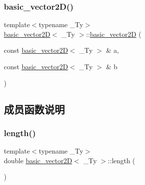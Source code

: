 \mbox{\label{structbasic__vector2_d_a348d37f966eeda40626112688649cb70}} 
\subsubsection{\texorpdfstring{basic\+\_\+vector2\+D()}{basic\_vector2D()}\hspace{0.1cm}{\footnotesize\ttfamily [2/2]}}
{\footnotesize\ttfamily template$<$typename \+\_\+\+Ty$>$ \\
\hyperlink{structbasic__vector2_d}{basic\+\_\+vector2D}$<$ \+\_\+\+Ty $>$\+::\hyperlink{structbasic__vector2_d}{basic\+\_\+vector2D} (\begin{DoxyParamCaption}\item[{const \hyperlink{structbasic__vector2_d}{basic\+\_\+vector2D}$<$ \+\_\+\+Ty $>$ \&}]{a,  }\item[{const \hyperlink{structbasic__vector2_d}{basic\+\_\+vector2D}$<$ \+\_\+\+Ty $>$ \&}]{b }\end{DoxyParamCaption})\hspace{0.3cm}{\ttfamily [inline]}}



\subsection{成员函数说明}
\mbox{\label{structbasic__vector2_d_a9a5e3046e0e3c08caa6bc56e6cf2d270}} 
\subsubsection{\texorpdfstring{length()}{length()}}
{\footnotesize\ttfamily template$<$typename \+\_\+\+Ty$>$ \\
double \hyperlink{structbasic__vector2_d}{basic\+\_\+vector2D}$<$ \+\_\+\+Ty $>$\+::length (\begin{DoxyParamCaption}{ }\end{DoxyParamCaption})\hspace{0.3cm}{\ttfamily [inline]}}

\mbox{\label{structbasic__vector2_d_abd00075de4f4635651d57ede1800ad27}} 
